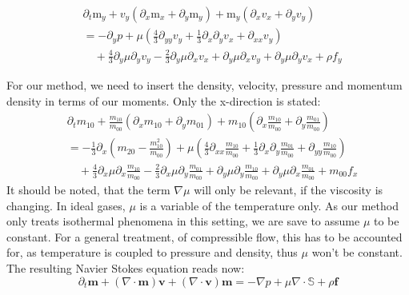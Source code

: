 \begin{equation}
  \begin{aligned}
    & \partial_t \text{m}_y
    + v_y (\partial_x \text{m}_x + \partial_y \text{m}_y)
    + \text{m}_y (\partial_x v_x + \partial_y v_y)  \\
    & =
     - \partial_y p
     + \mu \left(\frac{4}{3}\partial_{yy}v_y
            + \frac{1}{3}\partial_x\partial_y v_x
            + \partial_{xx} v_y \right) \\
    &\quad + \frac{4}{3}\partial_y \mu \partial_y v_y
    - \frac{2}{3}\partial_y \mu \partial_x v_x
    + \partial_y \mu \partial_x v_y
    + \partial_y \mu \partial_y v_x
    + \rho f_y
  \end{aligned}
\end{equation}

For our method, we need to insert the density, velocity, pressure and momentum density in terms of our moments.
Only the x-direction is stated:
\begin{equation}
  \begin{aligned}
    & \partial_t m_{10}
    + \frac{m_{10}}{m_{00}} (\partial_x m_{10} + \partial_y m_{01})
    + m_{10} (\partial_x \frac{m_{10}}{m_{00}} + \partial_y \frac{m_{01}}{m_{00}})  \\
    & =
     - \frac{1}{3} \partial_x \left(m_{20} - \frac{ m_{10}^2 }{ m_{00} } \right)
     + \mu \left(\frac{4}{3}\partial_{xx}\frac{m_{10}}{m_{00}}
            + \frac{1}{3}\partial_x\partial_y \frac{m_{01}}{m_{00}}
            + \partial_{yy} \frac{m_{10}}{m_{00}} \right) \\
    &\quad + \frac{4}{3}\partial_x \mu \partial_x \frac{m_{10}}{m_{00}}
    - \frac{2}{3}\partial_x \mu \partial_y \frac{m_{01}}{m_{00}}
    + \partial_y \mu \partial_y \frac{m_{10}}{m_{00}}
    + \partial_y \mu \partial_x \frac{m_{01}}{m_{00}}
    + m_{00}f_x
  \end{aligned}
\end{equation}
It should be noted, that the term $\nabla \mu$ will only be relevant, if the viscosity is changing. In ideal gases, $\mu$ is a variable of the temperature only. As our method only treats isothermal phenomena in this setting, we are save to assume $\mu$ to be constant.
For a general treatment, of compressible flow, this has to be accounted for, as temperature is coupled to pressure and density, thus $\mu$ won't be constant.
The resulting Navier Stokes equation reads now:
\begin{equation}
  \label{eq:compressible NS isotherm}
  \partial_t \mathbf{m} + (\nabla \cdot \mathbf{m})\mathbf{v} + (\nabla \cdot \mathbf{v})\mathbf{m}
    = - \nabla p + \mu \nabla \cdot \mathbb{S} + \rho \mathbf{f}
\end{equation}
